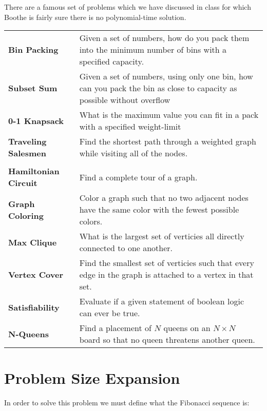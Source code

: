 \documentclass[aip, jmp, amsmath,amssymb, reprint]{revtex4-1}
\theoremstyle{definition}
\begin{document}
There are a famous set of problems which we have discussed in class for which Boothe is fairly sure there is no polynomial-time solution.
\begin{longtable}{p{2.2cm} p{6cm} }
    \textbf{Bin Packing} & Given a set of numbers, how do you pack them into the minimum number of bins with a specified capacity. \\
    \textbf{Subset Sum} & Given a set of numbers, using only one bin, how can you pack the bin as close to capacity as possible without 
                          overflow \\
    \textbf{0-1 Knapsack} & What is the maximum value you can fit in a pack with a specified weight-limit \\
    \textbf{Traveling Salesmen} & Find the shortest path through a weighted graph while visiting all of the nodes. \\\\
    \textbf{Hamiltonian Circuit} & Find a complete tour of a graph. \\
    \textbf{Graph Coloring} & Color a graph such that no two adjacent nodes have the same color with the fewest possible colors. \\
    \textbf{Max Clique} & What is the largest set of verticies all directly connected to one another. \\
    \textbf{Vertex Cover} & Find the smallest set of verticies such that every edge in the graph is attached to a vertex in that set. \\
    \textbf{Satisfiability} & Evaluate if a given statement of boolean logic can ever be true. \\
    \textbf{N-Queens} & Find a placement of $N$ queens on an $N\times N$ board so that no queen threatens another queen. \\
\end{longtable}

\section{Problem Size Expansion}

In order to solve this problem we must define what the Fibonacci sequence is:
\end{document}
